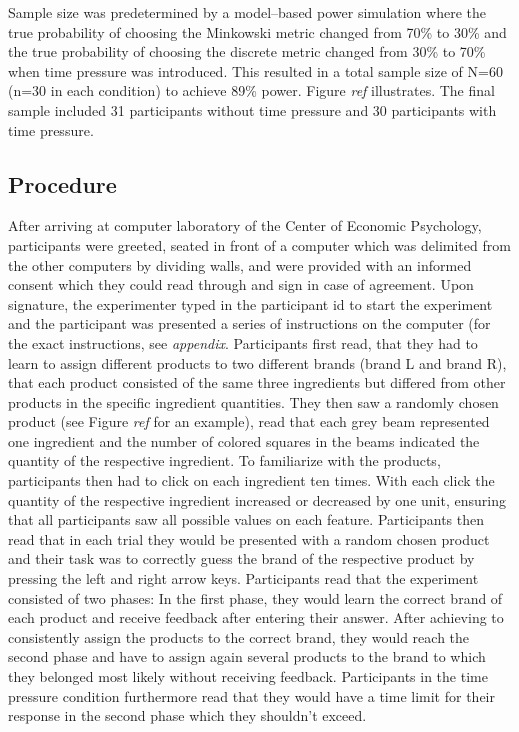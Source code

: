 \documentclass[a4paper,man,natbib]{apa6}
\begin{document}
Sample size was predetermined by a model--based power simulation where the true probability of choosing the Minkowski metric changed from 70\% to 30\% and the true probability of choosing the discrete metric changed from 30\% to 70\% when time pressure was introduced. This resulted in a total sample size of N=60 (n=30 in each condition) to achieve 89\% power. Figure \textit{ref} illustrates. The final sample included 31 participants without time pressure and 30 participants with time pressure.

\subsection{Procedure}
After arriving at computer laboratory of the Center of Economic Psychology, participants were greeted, seated in front of a computer which was delimited from the other computers by dividing walls, and were provided with an informed consent which they could read through and sign in case of agreement. Upon signature, the experimenter typed in the participant id to start the experiment and the participant was presented a series of instructions on the computer (for the exact instructions, see \textit{appendix}. Participants first read, that they had to learn to assign different products to two different brands (brand L and brand R), that each product consisted of the same three ingredients but differed from other products in the specific ingredient quantities. They then saw a randomly chosen product (see Figure \textit{ref} for an example), read that each grey beam represented one ingredient and the number of colored squares in the beams indicated the quantity of the respective ingredient. To familiarize with the products, participants then had to click on each ingredient ten times. With each click the quantity of the respective ingredient increased or decreased by one unit, ensuring that all participants saw all possible values on each feature. Participants then read that in each trial they would be presented with a random chosen product and their task was to correctly guess the brand of the respective product by pressing the left and right arrow keys. Participants read that the experiment consisted of two phases: In the first phase, they would learn the correct brand of each product and receive feedback after entering their answer. After achieving to consistently assign the products to the correct brand, they would reach the second phase and have to assign again several products to the brand to which they belonged most likely without receiving feedback. Participants in the time pressure condition furthermore read that they would have a time limit for their response in the second phase which they shouldn't exceed.
\end{document}
